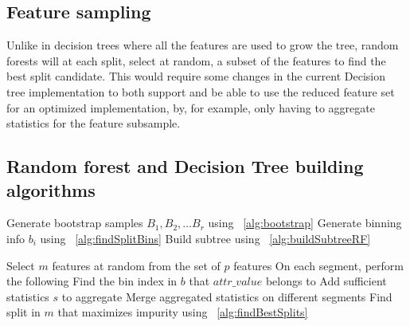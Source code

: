 \subsection{Feature sampling}
Unlike in decision trees where all the features are used to grow the tree, 
random forests will at each split, select at random, a subset of the 
features to find the best split candidate. This would require some changes
in the current Decision tree implementation to both support and be able to
use the reduced feature set for an optimized implementation, by, for example,
only having to aggregate statistics for the feature subsample. 
 
\subsection{Random forest and Decision Tree building algorithms}
\begin{algorithm}[BuildRandomForest$(D^*)$] \label{alg:buildRandomForest}
\begin{algorithmic}[1]
   \State Generate bootstrap samples $B_{1}, B_{2}, \dots B_{r}$ 
   using ~\ref{alg:bootstrap}
       \State Generate binning info $b_{i}$ using ~\ref{alg:findSplitBins}
       \State Build subtree using ~\ref{alg:buildSubtreeRF}
   \EndFor
   \end{algorithmic}
\end{algorithm}

\begin{algorithm}[buildSubtreeRandomForest$(D^*, M, n_l, B)$] \label{alg:buildSubtreeRF}
\begin{algorithmic}[1]
   \State Select $m$ features at random from the set of $p$ features
   \State On each segment, perform the following 
            \State Find the bin index in $b$ that $attr\_value$ belongs to
            \State Add sufficient statistics $s$ to aggregate
        \EndFor
    \EndFor
    \State Merge aggregated statistics on different segments 
    \State Find split in $m$ that maximizes impurity using ~\ref{alg:findBestSplits}
\end{algorithmic}
\end{algorithm}

